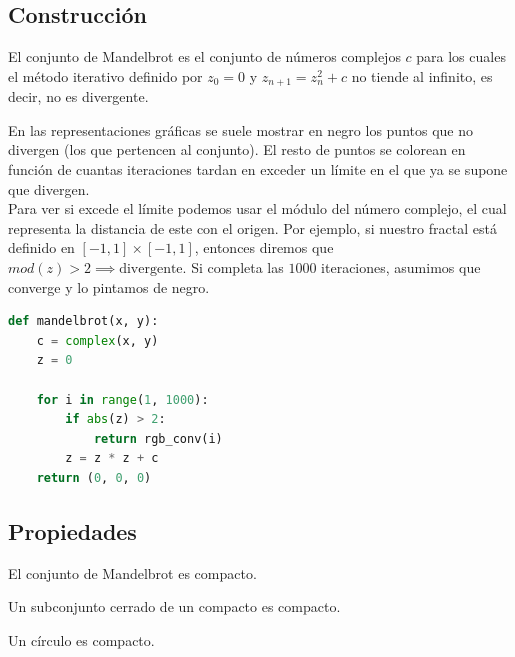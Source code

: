 \subsection{Construcción}

\begin{definition}
    El conjunto de Mandelbrot es el conjunto de números complejos $c$ para los cuales el método iterativo definido por $z_0 = 0$ y $z_{n+1} = z_n^2 + c$ no tiende al infinito, es decir, no es divergente.\cite{Medina_2011}
\end{definition}

\noindent En las representaciones gráficas se suele mostrar en negro los puntos que no divergen (los que pertencen al conjunto). El resto de puntos se colorean en función de cuantas iteraciones tardan en exceder un límite en el que ya se supone que divergen.\\

\noindent Para ver si excede el límite podemos usar el módulo del número complejo, el cual representa la distancia de este con el origen. Por ejemplo, si nuestro fractal está definido en $[-1,1] \times [-1,1]$, entonces diremos que $mod(z)>2 \implies \text{divergente}$.
Si completa las $1000$ iteraciones, asumimos que converge y lo pintamos de negro.\\

\begin{lstlisting}[language=Python]
def mandelbrot(x, y):
    c = complex(x, y)
    z = 0

    for i in range(1, 1000):
        if abs(z) > 2:
            return rgb_conv(i)
        z = z * z + c
    return (0, 0, 0)
\end{lstlisting}

\subsection{Propiedades}

\begin{theorem}
    El conjunto de Mandelbrot es compacto. \cite{Wikipedia_Mandelbrot}
\end{theorem}

\begin{lemma}
    Un subconjunto cerrado de un compacto es compacto.
\end{lemma}

\begin{lemma}
    Un círculo es compacto.
\end{lemma}

